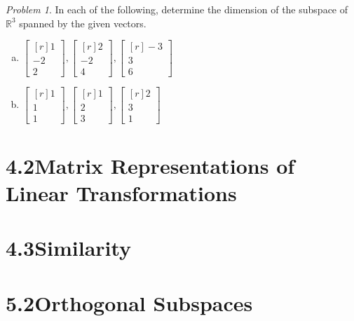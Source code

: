 \documentclass[12pt, letterpaper]{article}
\theoremstyle{remark}
\newtheorem{problem}{Problem}
\theoremstyle{remark}
\begin{document}
        \begin{problem}
            
            In each of the following, determine the dimension
            of the subspace of \(\mathbb{R}^3\) spanned by the given vectors.
    
            \begin{enumerate}[(a)]
                \item \(
                    \begin{bmatrix*}[r]
                        1 \\
                        -2 \\
                        2
                    \end{bmatrix*},
                    \begin{bmatrix*}[r]
                        2 \\
                        -2 \\
                        4
                    \end{bmatrix*},
                    \begin{bmatrix*}[r]
                        -3 \\
                        3 \\
                        6
                    \end{bmatrix*}
                \)
                \item \(
                    \begin{bmatrix*}[r]
                        1 \\
                        1 \\
                        1
                    \end{bmatrix*},
                    \begin{bmatrix*}[r]
                        1 \\
                        2 \\
                        3
                    \end{bmatrix*},
                    \begin{bmatrix*}[r]
                        2 \\
                        3 \\
                        1
                    \end{bmatrix*}
                \)
    
            \end{enumerate}
    
        \end{problem}
    
        \section*{4.2\quad{}Matrix Representations of Linear Transformations}
    
        \section*{4.3\quad{}Similarity}
    
        \section*{5.2\quad{}Orthogonal Subspaces}
    
    
\end{document}
